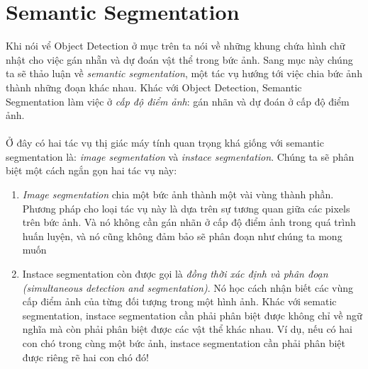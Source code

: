 \documentclass{article}
\begin{document}
\section{Semantic Segmentation}
Khi nói vể Object Detection ở mục trên ta nói về những khung chứa hình chữ nhật cho việc gán nhẵn và dự đoán vật thể trong bức ảnh. Sang mục này chúng ta sẽ thảo luận về \textit{semantic segmentation}, một tác vụ hướng tới việc chia bức ảnh thành những đoạn khác nhau. Khác với Object Detection, Semantic Segmentation làm việc ở \textit{cấp độ điểm ảnh}: gán nhãn và dự đoán ở cấp độ điểm ảnh.
\\\\
Ở đây có hai tác vụ thị giác máy tính quan trọng khá giống với semantic segmentation là: \textit{image segmentation} và \textit{instace segmentation}. Chúng ta sẽ phân biệt một cách ngắn gọn hai tác vụ này:
\begin{enumerate}
    \item \textit{Image segmentation} chia một bức ảnh thành một vài vùng thành phần. Phương pháp cho loại tác vụ này là dựa trên sự tương quan giữa các pixels trên bức ảnh. Và nó không cần gán nhãn ở cấp độ điểm ảnh trong quá trình huấn luyện, và nó cũng không đảm bảo sẽ phân đoạn như chúng ta mong muốn
    \item {Instace segmentation} còn được gọi là \textit{đồng thời xác định và phân đoạn (simultaneous detection and segmentation)}. Nó học cách nhận biết các vùng cấp điểm ảnh của từng đối tượng trong một hình ảnh. Khác với sematic segmentation, instace segmentation cần phải phân biệt được không chỉ về ngữ nghĩa mà còn phải phân biệt được các vật thể khác nhau. Ví dụ, nếu có hai con chó trong cùng một bức ảnh, instace segmentation cần phải phân biệt được riêng rẽ hai con chó đó!
\end{enumerate}
\end{document}
